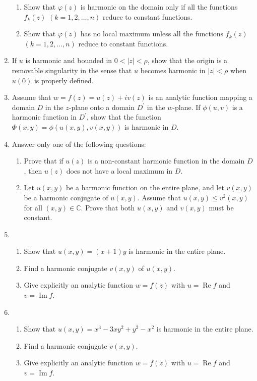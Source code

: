 \documentclass[a4paper,10pt]{article}
\renewcommand{\Re}{\operatorname{Re}}
\renewcommand{\Im}{\operatorname{Im}}
\begin{document}
\begin{enumerate}
		\begin{enumerate}
			\item Show that $\varphi(z)$ is harmonic on the domain only if all the functions $f_{k}(z)$ $(k=1,2,\ldots,n)$ reduce to constant functions.
			\item Show that $\varphi(z)$ has no local maximum unless all the functions $f_{k}(z)$ $(k=1,2,\ldots,n)$ reduce to constant functions.
		\end{enumerate}
		
		\item  If $u$ is harmonic and bounded in $0<|z|<\rho$, show that the origin is a removable singularity in the sense that $u$ becomes harmonic in $|z|<\rho$ when $u(0)$ is properly defined.
		
		\item Assume that $w=f(z)=u(z)+iv(z)$ is an analytic function mapping a domain $D$ in the $z$-plane onto a domain $D^{\prime}$ in the $w$-plane.
		If $\phi(u,v)$ is a harmonic function in $D^{\prime}$, show that the function $\Phi(x,y)=\phi(u(x,y),v(x,y))$ is harmonic in $D$.
		
		\item Answer only one of the following questions:
		
		\begin{enumerate} 
			\item Prove that if $u(z)$ is a non-constant harmonic function in the domain $D$, then $u(z)$ does not have a local maximum in $D$.
		
	\item Let $u(x,y)$ be a harmonic function on the entire plane, and let $v(x,y)$ be a harmonic conjugate of $u(x,y)$.
		Assume that $u(x,y)\le v^{2}(x,y)$ for all $(x,y)\in \mathbb{C}$. Prove that both $u(x,y)$ and $v(x,y)$ must be constant.
			\end{enumerate}
		
		\item 
		\begin{enumerate}
			\item  Show that $u(x,y)=(x+1)y$ is harmonic in the entire plane.
			\item  Find a harmonic conjugate $v(x,y)$ of $u(x,y)$.
			\item Give explicitly an analytic function $w=f(z)$ with $u=\Re f$ and $v=\Im f$.
		\end{enumerate}

		
		\item 
		\begin{enumerate}
			\item Show that $u(x,y)=x^{3}-3xy^{2}+y^{2}-x^{2}$ is harmonic in the entire plane.
			\item Find a harmonic conjugate $v(x,y)$.
		\item Give explicitly an analytic function $w=f(z)$ with $u=\Re f$ and $v=\Im f$.
		\end{enumerate}
		

\end{enumerate}
\end{document}
